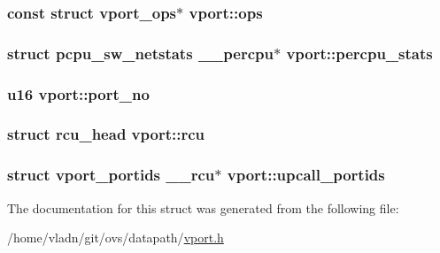 \subsubsection[{ops}]{\setlength{\rightskip}{0pt plus 5cm}const struct {\bf vport\+\_\+ops}$\ast$ vport\+::ops}\label{structvport_a5af933fc664c1194ac3bbc337da35586}
\hypertarget{structvport_a04983f0d17ae4deb6ffb87333f6d4f05}{}
\subsubsection[{percpu\+\_\+stats}]{\setlength{\rightskip}{0pt plus 5cm}struct {\bf pcpu\+\_\+sw\+\_\+netstats} {\bf \+\_\+\+\_\+percpu}$\ast$ vport\+::percpu\+\_\+stats}\label{structvport_a04983f0d17ae4deb6ffb87333f6d4f05}
\hypertarget{structvport_aae00fc5d12b47f02cbfd4f67ae114b58}{}
\subsubsection[{port\+\_\+no}]{\setlength{\rightskip}{0pt plus 5cm}u16 vport\+::port\+\_\+no}\label{structvport_aae00fc5d12b47f02cbfd4f67ae114b58}
\hypertarget{structvport_ac08b8a62e054bc2840a9ba6964091f89}{}
\subsubsection[{rcu}]{\setlength{\rightskip}{0pt plus 5cm}struct rcu\+\_\+head vport\+::rcu}\label{structvport_ac08b8a62e054bc2840a9ba6964091f89}
\hypertarget{structvport_a7963679d5c8d3a923eb42faf9d5fb2d1}{}
\subsubsection[{upcall\+\_\+portids}]{\setlength{\rightskip}{0pt plus 5cm}struct {\bf vport\+\_\+portids} {\bf \+\_\+\+\_\+rcu}$\ast$ vport\+::upcall\+\_\+portids}\label{structvport_a7963679d5c8d3a923eb42faf9d5fb2d1}


The documentation for this struct was generated from the following file\+:\begin{DoxyCompactItemize}
\item 
/home/vladn/git/ovs/datapath/\hyperlink{vport_8h}{vport.\+h}\end{DoxyCompactItemize}

